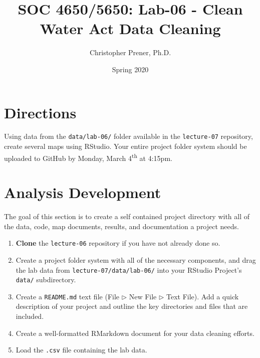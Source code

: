 \documentclass{tufte-handout}
\title{SOC 4650/5650: Lab-06 - Clean Water Act Data Cleaning}
\author{Christopher Prener, Ph.D.}
\date{Spring 2020}
\begin{document}
\maketitle %

\section{Directions}
Using data from the \texttt{data/lab-06/} folder available in the \texttt{lecture-07} repository, create several maps using RStudio. Your entire project folder system should be uploaded to GitHub by Monday, March 4\textsuperscript{th} at 4:15pm.

\vspace{5mm}
\section{Analysis Development}
The goal of this section is to create a self contained project directory with all of the data, code, map documents, results, and documentation a project needs.

\begin{enumerate}[label=\alph*.]
\item \textbf{Clone} the \texttt{lecture-06} repository if you have not already done so.
\item Create a project folder system with all of the necessary components, and drag the lab data from \texttt{lecture-07/data/lab-06/} into your RStudio Project's \texttt{data/} subdirectory.
\item Create a \texttt{README.md} text file (\textsf{File $\triangleright$} {\color{red}\textsf{New File}} \textsf{$\triangleright$ Text File}). Add a quick description of your project and outline the key directories and files that are included. 
\item Create a well-formatted RMarkdown document for your data cleaning efforts.
\item Load the \texttt{.csv} file containing the lab data.
\end{enumerate}

\vspace{5mm}
\end{document}
